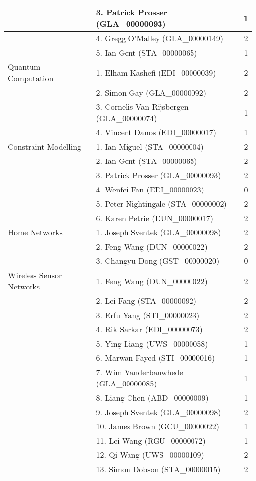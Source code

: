 \begin{longtable}{|l|l|c|}
\hline  & 3. Patrick Prosser (GLA\_00000093) & 1 \\
\hline  & 4. Gregg O'Malley (GLA\_00000149) & 2 \\
\hline  & 5. Ian Gent (STA\_00000065) & 1 \\
\hline Quantum Computation & 1. Elham Kashefi (EDI\_00000039) & 2 \\
\hline  & 2. Simon Gay (GLA\_00000092) & 2 \\
\hline  & 3. Cornelis Van Rijsbergen (GLA\_00000074) & 1 \\
\hline  & 4. Vincent Danos (EDI\_00000017) & 1 \\
\hline Constraint Modelling & 1. Ian Miguel (STA\_00000004) & 2 \\
\hline  & 2. Ian Gent (STA\_00000065) & 2 \\
\hline  & 3. Patrick Prosser (GLA\_00000093) & 2 \\
\hline  & 4. Wenfei Fan (EDI\_00000023) & 0 \\
\hline  & 5. Peter Nightingale (STA\_00000002) & 2 \\
\hline  & 6. Karen Petrie (DUN\_00000017) & 2 \\
\hline Home Networks & 1. Joseph Sventek (GLA\_00000098) & 2 \\
\hline  & 2. Feng Wang (DUN\_00000022) & 2 \\
\hline  & 3. Changyu Dong (GST\_00000020) & 0 \\
\hline Wireless Sensor Networks & 1. Feng Wang (DUN\_00000022) & 2 \\
\hline  & 2. Lei Fang (STA\_00000092) & 2 \\
\hline  & 3. Erfu Yang (STI\_00000023) & 2 \\
\hline  & 4. Rik Sarkar (EDI\_00000073) & 2 \\
\hline  & 5. Ying Liang (UWS\_00000058) & 1 \\
\hline  & 6. Marwan Fayed (STI\_00000016) & 1 \\
\hline  & 7. Wim Vanderbauwhede (GLA\_00000085) & 1 \\
\hline  & 8. Liang Chen (ABD\_00000009) & 1 \\
\hline  & 9. Joseph Sventek (GLA\_00000098) & 2 \\
\hline  & 10. James Brown (GCU\_00000022) & 1 \\
\hline  & 11. Lei Wang (RGU\_00000072) & 1 \\
\hline  & 12. Qi Wang (UWS\_00000109) & 2 \\
\hline  & 13. Simon Dobson (STA\_00000015) & 2 \\

\end{longtable}
